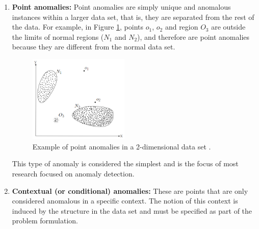 \begin{enumerate}[1.]

\item \textbf{Point anomalies: }Point anomalies are simply unique and anomalous instances within a larger data set, that is, they are separated from the rest of the data. For example, in Figure \ref{fig:anom_2D}, points $o_1$, $o_2$ and region $O_3$ are outside the limits of normal regions ($N_1$ and $N_2$), and therefore are point anomalies because they are different from the normal data set.


\begin{figure}[h!]
  \begin{center}	\includegraphics[width=0.45\textwidth,frame]{imagenes/Cap2/anom_2D}
  \caption{Example of point anomalies in a 2-dimensional data set \protect\cite{Reference66}.}
  \label{fig:anom_2D}
  \end{center}
\end{figure}

\vspace{5mm} %

This type of anomaly is considered the simplest and is the focus of most research focused on anomaly detection.

\item \textbf{Contextual (or conditional) anomalies: }These are points that are only considered anomalous in a specific context. The notion of this context is induced by the structure in the data set and must be specified as part of the problem formulation.


\end{enumerate}

